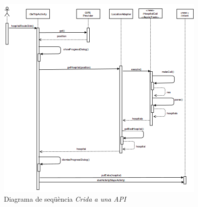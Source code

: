 \begin{figure}[!h]
\centering
\includegraphics[scale=1.2]{Figures/apiDS.png}
\caption{Diagrama de seqüència \textit{Crida a una API}}
\end{figure}
